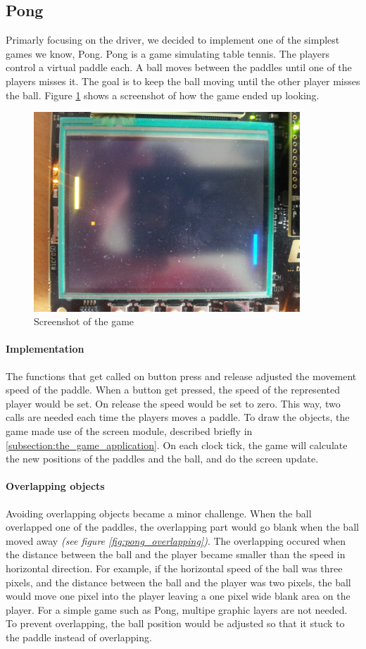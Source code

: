 \subsection{Pong}
\label{subsection:pong}
Primarly focusing on the driver, we decided to implement one of the simplest games we know, Pong. Pong is a game simulating table tennis. The players control a virtual paddle each. A ball moves between the paddles until one of the players misses it. The goal is to keep the ball moving until the other player misses the ball. Figure \ref{fig:pong_screenshot} shows a screenshot of how the game ended up looking.
\begin{figure}[h]
	\label{fig:pong_screenshot}
	\centering
	\includegraphics[width=10cm]{img/pong_screen.jpg}
	\caption{Screenshot of the game}
\end{figure}

\paragraph{Implementation} The functions that get called on button press and release adjusted the movement speed of the paddle. When a button get pressed, the speed of the represented player would be set. On release the speed would be set to zero. This way, two calls are needed each time the players moves a paddle. To draw the objects, the game made use of the screen module, described briefly in \ref{subsection:the_game_application}. On each clock tick, the game will calculate the new positions of the paddles and the ball, and do the screen update.

\paragraph{Overlapping objects} 
Avoiding overlapping objects became a minor challenge. When the ball overlapped one of the paddles, the overlapping part would go blank when the ball moved away \emph{(see figure \ref{fig:pong_overlapping})}.
The overlapping occured when the distance between the ball and the player became smaller than the speed in horizontal direction. For example, if the horizontal speed of the ball was three pixels, and the distance between the ball and the player was two pixels, the ball would move one pixel into the player leaving a one pixel wide blank area on the player. For a simple game such as Pong, multipe graphic layers are not needed. To prevent overlapping, the ball position would be adjusted so that it stuck to the paddle instead of overlapping. 

